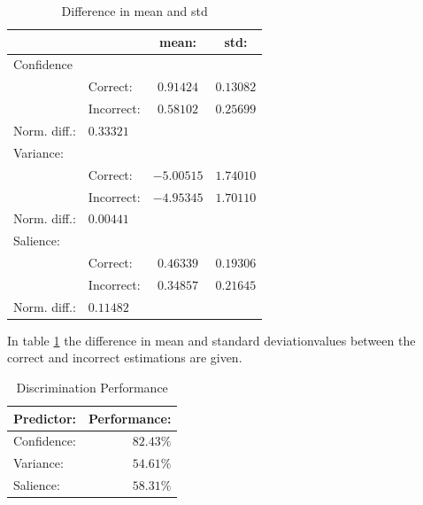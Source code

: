 \documentclass{proc}
\begin{document}
\begin{table}[h]
    \begin{center}
        \begin{tabular}{ | l | l | c | c |}
            \hline
                        &           &   mean:       &   std:        \\ \hline
            Confidence  &           &               &               \\  \hline
                        & Correct:  &   $0.91424$   &   $0.13082$   \\  \hline
                        &Incorrect: &   $0.58102$   &   $0.25699$   \\  \hline
            Norm. diff.:    &   $0.33321$   &&\\  \hline
            \hline
            Variance:   &           &               &               \\  \hline
                        & Correct:  &   $-5.00515$  &   $1.74010$   \\  \hline
                        &Incorrect: &   $-4.95345$   &   $1.70110$   \\  \hline
            Norm. diff.:    &   $0.00441$   &&\\  \hline
            \hline
            Salience:   &           &               &               \\  \hline
                        & Correct:  &   $0.46339$   &   $0.19306$   \\  \hline
                        &Incorrect: &   $0.34857$   &   $0.21645$   \\  \hline
            Norm. diff.:    &   $0.11482$   &&\\  \hline
        \end{tabular}
        \caption{Difference in mean and std}
        \label{table:related}
    \end{center}
\end{table}
In table \ref{table:related} the difference in mean and standard deviationvalues between the correct and incorrect estimations are given.
\begin{table}[h]
    \begin{center}
        \begin{tabular}{ | l | r |}
            \hline
            Predictor:  &   Performance:\\  \hline
            \hline
            Confidence: &   $82.43\%$   \\  \hline
            Variance:   &   $54.61\%$   \\  \hline
            Salience:   &   $58.31\%$   \\  \hline
        \end{tabular}
        \caption{Discrimination Performance}
        \label{table:pred_cvs}
    \end{center}
\end{table}
\end{document}
